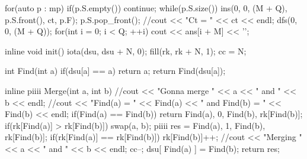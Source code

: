 \begin{C++}
{{        for(auto p : mp){
            if(p.S.empty()) continue;
            while(p.S.size()){
                ins(0, 0, (M + Q), p.S.front(), ct, p.F);
                p.S.pop_front();
            }
        }
        //cout << "Ct = " << ct << endl;
        dfs(0, 0, (M + Q));
        for(int i = 0; i < Q; ++i){
            cout << ans[i + M] << '\n';
        }
    }
}

inline void init(){
    iota(dsu, dsu + N, 0);
    fill(rk, rk + N, 1);
    cc = N;
}

int Find(int a){
    if(dsu[a] == a) return a;
    return Find(dsu[a]);
}

inline piiii Merge(int a, int b){
    //cout << "Gonna merge " << a << " and " << b << endl;
    //cout << "Find(a) = " << Find(a) << " and Find(b) = " << Find(b) << endl;
    if(Find(a) == Find(b)) return {{Find(a), 0}, {Find(b), rk[Find(b)]}};
    if(rk[Find(a)] > rk[Find(b)]) swap(a, b);
    piiii res = {{Find(a), 1}, {Find(b), rk[Find(b)]}};
    if(rk[Find(a)] == rk[Find(b)]) rk[Find(b)]++;
    //cout << "Merging " << a << " and " << b << endl;
    cc--;
    dsu[ Find(a) ] = Find(b);
    return res;
}
\end{C++}

